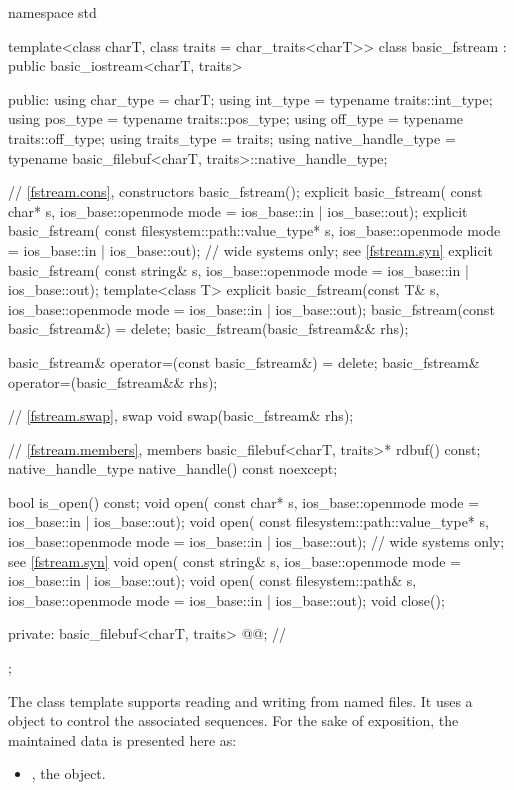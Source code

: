 %
\begin{codeblock}
namespace std {
  template<class charT, class traits = char_traits<charT>>
  class basic_fstream : public basic_iostream<charT, traits> {
  public:
    using char_type   = charT;
    using int_type    = typename traits::int_type;
    using pos_type    = typename traits::pos_type;
    using off_type    = typename traits::off_type;
    using traits_type = traits;
    using native_handle_type = typename basic_filebuf<charT, traits>::native_handle_type;

    // \ref{fstream.cons}, constructors
    basic_fstream();
    explicit basic_fstream(
      const char* s,
      ios_base::openmode mode = ios_base::in | ios_base::out);
    explicit basic_fstream(
      const filesystem::path::value_type* s,
      ios_base::openmode mode = ios_base::in | ios_base::out);  // wide systems only; see \ref{fstream.syn}
    explicit basic_fstream(
      const string& s,
      ios_base::openmode mode = ios_base::in | ios_base::out);
    template<class T>
      explicit basic_fstream(const T& s, ios_base::openmode mode = ios_base::in | ios_base::out);
    basic_fstream(const basic_fstream&) = delete;
    basic_fstream(basic_fstream&& rhs);

    basic_fstream& operator=(const basic_fstream&) = delete;
    basic_fstream& operator=(basic_fstream&& rhs);

    // \ref{fstream.swap}, swap
    void swap(basic_fstream& rhs);

    // \ref{fstream.members}, members
    basic_filebuf<charT, traits>* rdbuf() const;
    native_handle_type native_handle() const noexcept;

    bool is_open() const;
    void open(
      const char* s,
      ios_base::openmode mode = ios_base::in | ios_base::out);
    void open(
      const filesystem::path::value_type* s,
      ios_base::openmode mode = ios_base::in | ios_base::out);  // wide systems only; see \ref{fstream.syn}
    void open(
      const string& s,
      ios_base::openmode mode = ios_base::in | ios_base::out);
    void open(
      const filesystem::path& s,
      ios_base::openmode mode = ios_base::in | ios_base::out);
    void close();

  private:
    basic_filebuf<charT, traits> @@;    // \expos
  };
}
\end{codeblock}

\pnum
The
class template
supports reading and writing from named files.
It uses a
object to control the associated sequences.
For the sake of exposition, the maintained data is presented here as:
\begin{itemize}
\item
{}, the  object.
\end{itemize}

